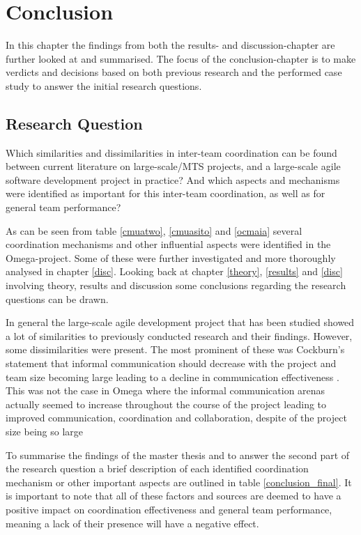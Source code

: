 \chapter{Conclusion}
\label{concl}

\minitoc

In this chapter the findings from both the results- and discussion-chapter are further looked at and summarised. The focus of the conclusion-chapter is to make verdicts and decisions based on both previous research and the performed case study to answer the initial research questions.

\newpage

\section{Research Question}

\begin{fancyquotes}
Which similarities and dissimilarities in inter-team coordination can be found between current literature on large-scale/MTS projects, and a large-scale agile software development project in practice? And which aspects and mechanisms were identified as important for this inter-team coordination, as well as for general team performance?
\end{fancyquotes}

As can be seen from table \ref{cmuatwo}, \ref{cmuasito} and \ref{ocmaia} several coordination mechanisms and other influential aspects were identified in the Omega-project. Some of these were further investigated and more thoroughly analysed in chapter \ref{disc}. Looking back at chapter \ref{theory}, \ref{results} and \ref{disc} involving theory, results and discussion some conclusions regarding the research questions can be drawn.

In general the large-scale agile development project that has been studied showed a lot of similarities to previously conducted research and their findings. However, some dissimilarities were present. The most prominent of these was Cockburn's statement that informal communication should decrease with the project and team size becoming large leading to a decline in communication effectiveness \cite{Cockburn2000}. This was not the case in Omega where the informal communication arenas actually seemed to increase throughout the course of the project leading to improved communication, coordination and collaboration, despite of the project size being so large

To summarise the findings of the master thesis and to answer the second part of the research question a brief description of each identified coordination mechanism or other important aspects are outlined in table \ref{conclusion_final}. It is important to note that all of these factors and sources are deemed to have a positive impact on coordination effectiveness and general team performance, meaning a lack of their presence will have a negative effect.

